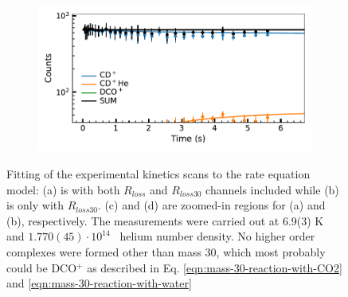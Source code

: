 \begin{figure}[!htb]
\begin{subfigure}[b]{0.49\textwidth}
    \end{subfigure}
    \hfill
    \begin{subfigure}[b]{0.49\textwidth}
        \centering
        \includegraphics[width=1\textwidth]{figures/measurements/kinetics/loss_channels/trap_and_m_30_loss_zoomed.pdf}
        \caption{}
        
    \end{subfigure}
    
    
        
    
    \caption{Fitting of the experimental kinetics scans to the rate equation model: (a) is with both $R_{loss}$ and $R_{loss30}$ channels included while (b) is only with $R_{loss30}$. (c) and (d) are zoomed-in regions for (a) and (b), respectively. The measurements were carried out at 6.9(3) K and  $1.770(45) \cdot 10^{14}$ \percc\ helium number density. No higher order complexes were formed other than mass 30, which most probably could be DCO$^+$ as described in Eq. \ref{eqn:mass-30-reaction-with-CO2} and \ref{eqn:mass-30-reaction-with-water}}
    
    \label{fig:trap-and-m30-loss-channel-comparision}
\end{figure}